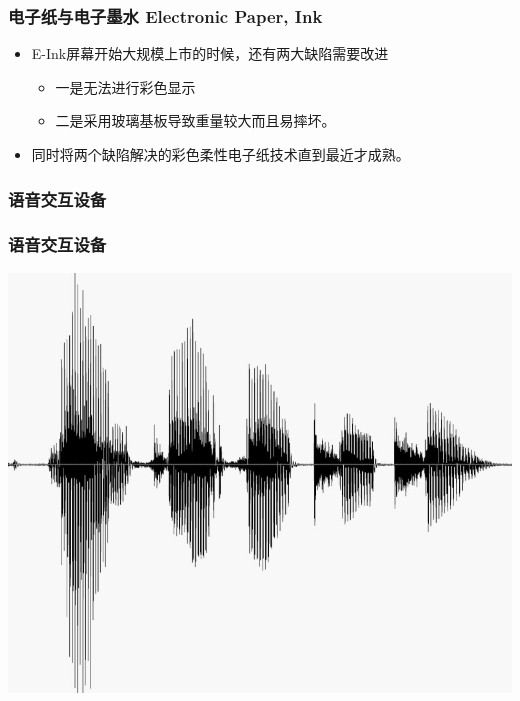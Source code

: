 \documentclass{beamer}
\newcommand{\fullPageImage}[2]{
	{
		\usebackgroundtemplate{\texttt{[image: \#1]}}
		\frame[plain]{#2}
	}
}
\begin{document}
\fullPageImage{images/glow-light.jpg}{\transwipe}
\fullPageImage{images/paper-white.jpg}{\transwipe}
\fullPageImage{images/paper-white-inside.jpg}{\transwipe}

\begin{frame}
	\frametitle{电子纸与电子墨水 Electronic Paper, Ink}
	\begin{itemize}
		\item E-Ink屏幕开始大规模上市的时候，还有两大缺陷需要改进
		\begin{itemize}
			\item 一是无法进行彩色显示
			\item 二是采用玻璃基板导致重量较大而且易摔坏。
		\end{itemize}
		\item 同时将两个缺陷解决的彩色柔性电子纸技术直到最近才成熟。
	\end{itemize}
\end{frame}

\fullPageImage{images/plastic-logic.jpg}{\transwipe}

\subsubsection{语音交互设备}
\begin{frame}
	\frametitle{语音交互设备}
	\begin{center}
	\includegraphics[width=.8\textwidth]{images/Speech-Recognition.jpg} 
	\end{center}
\end{frame}
\end{document}
